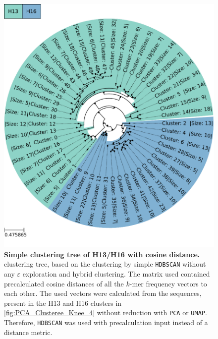 \begin{figure}[!hbt]
    \centering
    \includegraphics[width=\textwidth]{PCA/Clustertree_Segment_4_H_Cosine.pdf}
    \caption[Simple clustering tree of H13/H16 with cosine distance]{\textbf{Simple clustering tree of H13/H16 with cosine distance.} clustering tree, based on the clustering by simple \texttt{HDBSCAN} without any $\varepsilon$ exploration and hybrid clustering. The matrix used contained precalculated cosine distances of all the $k$-mer frequency vectors to each other. The used vectors were calculated from the sequences, present in the H13 and H16 clusters in \autoref{fig:PCA_Clusteree_Knee_4} without reduction with \texttt{PCA} or \texttt{UMAP}. Therefore, \texttt{HDBSCAN} was used with precalculation input instead of a distance metric.}
    \label{fig:Simple_Clustertree_Cosine}
\end{figure}


